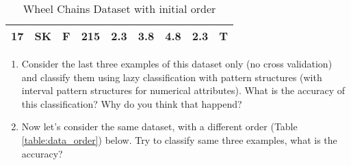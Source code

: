 \documentclass[12pt]{report}
\begin{document}
\begin{problem}{}
\begin{table}[H]
\begin{tabular}{|c|c|c|c|c|c|c|c|c|}
        17 & SK     & F      & 215   & 2.3 & 3.8  & 4.8 & 2.3 & T         \\ \hline
        \end{tabular}
    \caption{Wheel Chains Dataset with initial order}
    \label{table:data}
    \end{table}
    \begin{enumerate}
        \item Consider the last three examples of this dataset only (no cross validation) and classify them using lazy classification with pattern structures (with interval pattern structures for numerical attributes). What is the accuracy of this classification? Why do you think that happend?
        \item Now let's consider the same dataset, with a different order (Table \ref{table:data_order}) below. Try to classify same three examples, what is the accuracy?


\end{enumerate}
\end{problem}
\end{document}
